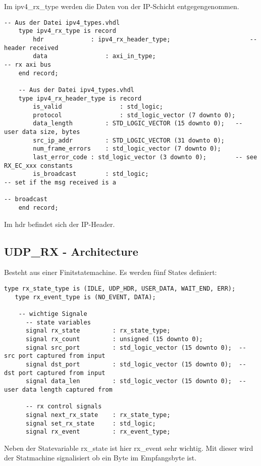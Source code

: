 Im ipv4_rx_type werden die Daten von der IP-Schicht entgegengenommen. 
	\begin{lstlisting}[style=myVHDL]
	-- Aus der Datei ipv4_types.vhdl
	type ipv4_rx_type is record
		hdr				: ipv4_rx_header_type;						-- header received
		data				: axi_in_type;									-- rx axi bus
	end record;

	-- Aus der Datei ipv4_types.vhdl
	type ipv4_rx_header_type is record
		is_valid				: std_logic;
		protocol				: std_logic_vector (7 downto 0);
		data_length			: STD_LOGIC_VECTOR (15 downto 0);	-- user data size, bytes
		src_ip_addr 		: STD_LOGIC_VECTOR (31 downto 0);
		num_frame_errors	: std_logic_vector (7 downto 0);
		last_error_code	: std_logic_vector (3 downto 0);		-- see RX_EC_xxx constants
		is_broadcast		: std_logic;								-- set if the msg received is a 
																				-- broadcast
	end record;

	\end{lstlisting}
Im hdr befindet sich der IP-Header.

\subsection{UDP_RX - Architecture}
Besteht aus einer Finitstatemachine. 
Es werden fünf States definiert: 
	\begin{lstlisting}[style=myVHDL] 
	type rx_state_type is (IDLE, UDP_HDR, USER_DATA, WAIT_END, ERR);
   type rx_event_type is (NO_EVENT, DATA);

	-- wichtige Signale
	  -- state variables
	  signal rx_state         : rx_state_type;
	  signal rx_count         : unsigned (15 downto 0);
	  signal src_port         : std_logic_vector (15 downto 0);  -- src port captured from input
	  signal dst_port         : std_logic_vector (15 downto 0);  -- dst port captured from input
	  signal data_len         : std_logic_vector (15 downto 0);  -- user data length captured from
	
	  -- rx control signals
	  signal next_rx_state    : rx_state_type;
	  signal set_rx_state     : std_logic;
	  signal rx_event         : rx_event_type;
	\end{lstlisting}

Neben der Statevariable rx_state ist hier rx_event sehr wichtig. 
Mit dieser wird der Statmachine signalisiert ob ein Byte im Empfangsbyte ist.

































